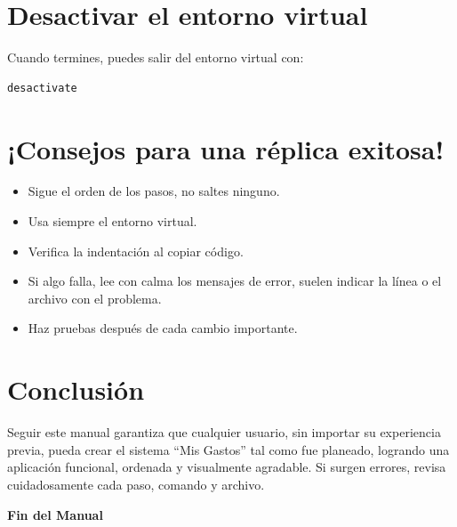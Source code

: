 \documentclass[12pt,a4paper]{article}
\begin{document}
\section{Desactivar el entorno virtual}
Cuando termines, puedes salir del entorno virtual con:
\begin{lstlisting}[language=bash]
desactivate
\end{lstlisting}

\section{¡Consejos para una réplica exitosa!}
\begin{itemize}
    \item Sigue el orden de los pasos, no saltes ninguno.
    \item Usa siempre el entorno virtual.
    \item Verifica la indentación al copiar código.
    \item Si algo falla, lee con calma los mensajes de error, suelen indicar la línea o el archivo con el problema.
    \item Haz pruebas después de cada cambio importante.
\end{itemize}

\section{Conclusión}
Seguir este manual garantiza que cualquier usuario, sin importar su experiencia previa, pueda crear el sistema “Mis Gastos” tal como fue planeado, logrando una aplicación funcional, ordenada y visualmente agradable. Si surgen errores, revisa cuidadosamente cada paso, comando y archivo.

\vfill
\begin{center}
    \textbf{ Fin del Manual }
\end{center}
\end{document}
